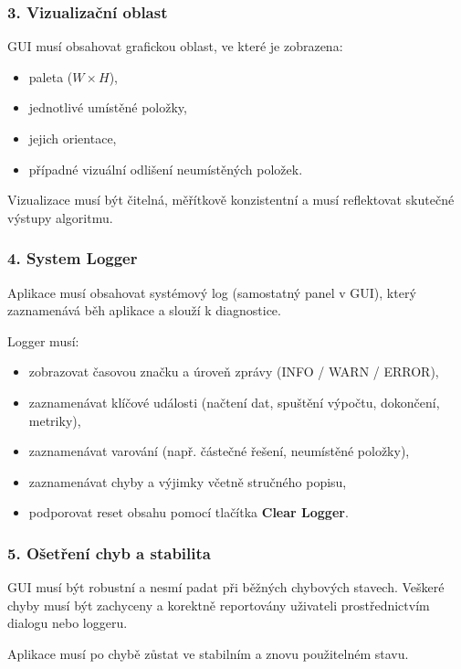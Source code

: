 \documentclass[12pt,a4paper]{article}
\begin{document}
\subsubsection*{3. Vizualizační oblast}

GUI musí obsahovat grafickou oblast, ve které je zobrazena:

\begin{itemize}
    \item paleta ($W \times H$),
    \item jednotlivé umístěné položky,
    \item jejich orientace,
    \item případné vizuální odlišení neumístěných položek.
\end{itemize}

Vizualizace musí být čitelná, měřítkově konzistentní
a musí reflektovat skutečné výstupy algoritmu.

\subsubsection*{4. System Logger}

Aplikace musí obsahovat systémový log (samostatný panel v GUI),
který zaznamenává běh aplikace a slouží k diagnostice.

Logger musí:

\begin{itemize}
    \item zobrazovat časovou značku a úroveň zprávy (INFO / WARN / ERROR),
    \item zaznamenávat klíčové události (načtení dat, spuštění výpočtu, dokončení, metriky),
    \item zaznamenávat varování (např. částečné řešení, neumístěné položky),
    \item zaznamenávat chyby a výjimky včetně stručného popisu,
    \item podporovat reset obsahu pomocí tlačítka \textbf{Clear Logger}.
\end{itemize}

\subsubsection*{5. Ošetření chyb a stabilita}

GUI musí být robustní a nesmí padat při běžných chybových stavech.
Veškeré chyby musí být zachyceny a korektně reportovány
uživateli prostřednictvím dialogu nebo loggeru.

Aplikace musí po chybě zůstat ve stabilním a znovu použitelném stavu.
\end{document}
